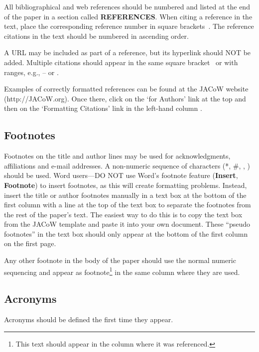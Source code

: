 \documentclass[a4paper,
              ]{jacow}
\newcommand\SEC[1]{\textbf{\uppercase{#1}}}
\begin{document}
All bibliographical and web references should be numbered and listed at the
end of the paper in a section called \SEC{References}. When citing a
reference in the text, place the corresponding reference number in square
brackets~\cite{exampl-ref}. The reference citations in the text should be numbered
in ascending order.

A URL may be included as part of a reference, but
its hyperlink should NOT be added. Multiple citations should appear in
the same square bracket~\cite{jacow-help, exampl-ref2, exampl-ref3} or
with ranges, e.g., \cite{jacow-help}--\cite{exampl-ref3} or \cite{jacow-help, exampl-ref, exampl-ref2, exampl-ref3, exampl-last}.

Examples of correctly formatted references can be found at the JACoW website (http://JACoW.org). Once there, click on the ‘for Authors’ link at the top and then on the ‘Formatting
Citations’ link in the left-hand column \cite{jacow-help}.

\subsection{Footnotes}

Footnotes on the title and author lines may be used for acknowledgments,
affiliations and e-mail addresses. A non-numeric sequence of characters (*, \#,
\dag, \ddag) should be used.
Word users---DO NOT use Word's footnote feature (\textbf{Insert}, \textbf{Footnote})
to insert footnotes, as this will create formatting problems. Instead, insert
the title or author footnotes manually in a text box at the bottom of the first column with a
line at the top of the text box to separate the footnotes from the rest of
the paper's text.  The easiest way to do this is to copy the text box from
the JACoW template and paste it into your own document.
These “pseudo footnotes” in the text box should only
appear at the bottom of the first column on the first page.

Any other footnote in the body of the paper should use the normal numeric
sequencing and appear as footnote\footnote{This text should appear
in the column where it was referenced.} in the same column where they are used.

\subsection{Acronyms}

Acronyms should be defined the first time they appear.
\end{document}
